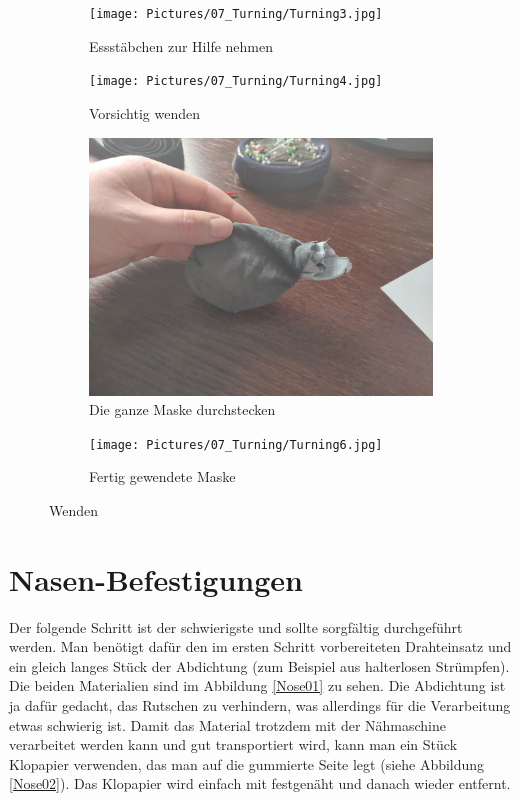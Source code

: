 \documentclass[12pt,parskip=full]{scrartcl}
\begin{document}
\begin{figure}[ht]
    \vspace{0.5cm}
    \centering
    \begin{subfigure}{0.48\textwidth}
        \centering
        \texttt{[image: Pictures/07\_Turning/Turning3.jpg]}
        \caption{Essstäbchen zur Hilfe nehmen}
        \label{Turning3}
    \end{subfigure}
    \begin{subfigure}{0.48\textwidth}
        \centering
        \texttt{[image: Pictures/07\_Turning/Turning4.jpg]}
        \caption{Vorsichtig wenden}
        \label{Turning4}
    \end{subfigure}
    \begin{subfigure}{0.48\textwidth}
        \centering
        \includegraphics[width = \linewidth]{Pictures/07_Turning/Turning5.jpg}
        \caption{Die ganze Maske durchstecken}
        \label{Turning5}
    \end{subfigure}
    \begin{subfigure}{0.48\textwidth}
        \centering
        \texttt{[image: Pictures/07\_Turning/Turning6.jpg]}
        \caption{Fertig gewendete Maske}
        \label{Turning6}
    \end{subfigure}
    \caption{Wenden}
    \label{TurningSecond}
\end{figure}

\section{Nasen-Befestigungen}
Der folgende Schritt ist der schwierigste und sollte sorgfältig durchgeführt werden. Man benötigt dafür den im ersten Schritt vorbereiteten Drahteinsatz und ein gleich langes Stück der Abdichtung (zum Beispiel aus halterlosen Strümpfen). Die beiden Materialien sind im Abbildung \ref{Nose01} zu sehen. Die Abdichtung ist ja dafür gedacht, das Rutschen zu verhindern, was allerdings für die Verarbeitung etwas schwierig ist. Damit das Material trotzdem mit der Nähmaschine verarbeitet werden kann und gut transportiert wird, kann man ein Stück Klopapier verwenden, das man auf die gummierte Seite legt (siehe Abbildung \ref{Nose02}). Das Klopapier wird einfach mit festgenäht und danach wieder entfernt.
\end{document}
